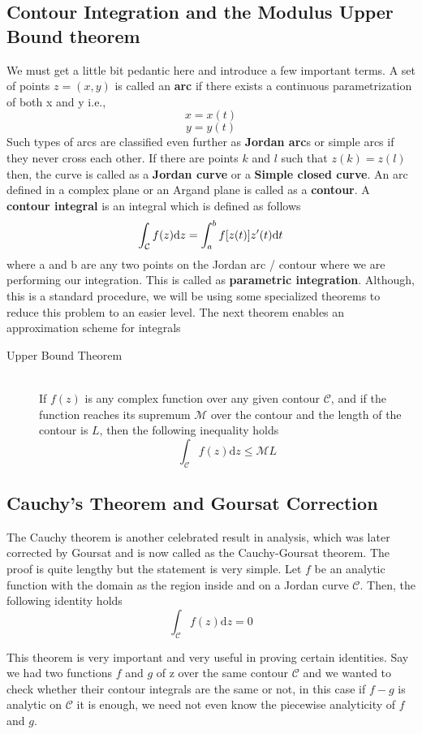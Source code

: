 \documentclass[11pt]{article}
\begin{document}
\begin{sloppypar}
\subsection{Contour Integration and the Modulus Upper Bound theorem}
We must get a little bit pedantic here and introduce a few important terms. A set of points $z = (x,y)$ is called an \textbf{arc} if there exists a continuous parametrization of both x and y i.e.,
$$x = x(t)$$
$$y = y(t)$$ 
Such types of arcs are classified even further as \textbf{Jordan arc}s or simple arcs if they never cross each other. If there are points $k$ and $l$ such that $z(k) = z(l)$ then, the curve is called as a \textbf{Jordan curve} or a \textbf{Simple closed curve}. An arc defined in a complex plane or an Argand plane is called as a \textbf{contour}.  A \textbf{contour integral} is an integral which is defined as follows\\
$$\int_\mathcal{C} f(z)\mathrm{d}z = \int_a^b f[z(t)]z\rq{}(t)\mathrm{d}t$$
where a and b are any two points on the Jordan arc / contour where we are performing our integration. This is called as \textbf{parametric integration}. Although, this is a standard procedure, we will be using some specialized theorems to reduce this problem to an easier level. The next theorem enables an approximation scheme for integrals
\begin{description}
\item[Upper Bound Theorem] \hfill \\
	If $f(z)$ is any complex function over any given contour $\mathcal{C}$, and if the function reaches its supremum $\mathcal{M}$ over the contour and the length of the contour is $L$, then the following inequality holds
	$$\int_\mathcal{C} f(z)\mathrm{d}z \leq \mathcal{M}L$$

\end{description}

\subsection{Cauchy\rq{}s Theorem and Goursat Correction}
The Cauchy theorem is another celebrated result in analysis, which was later corrected by Goursat and is now called as the Cauchy-Goursat theorem. The proof is quite lengthy but the statement is very simple. 
Let $f$ be an analytic function with the domain as the region inside and on a Jordan curve 
$\mathcal{C}$. Then, the following identity holds
$$\int_\mathcal{C} f(z)\mathrm{d}z = 0$$

This theorem is very important and very useful in proving certain identities. Say we had two functions $f$ and $g$ of z over the same contour $\mathcal{C}$ and we wanted to check whether their contour integrals are the same or not, in this case if $f-g$ is analytic on $\mathcal{C}$ it is enough, we need not even know the piecewise analyticity of $f$ and $g$.


\end{sloppypar}
\end{document}
